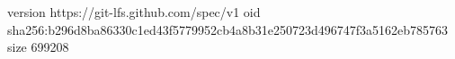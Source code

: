 version https://git-lfs.github.com/spec/v1
oid sha256:b296d8ba86330c1ed43f5779952cb4a8b31e250723d496747f3a5162eb785763
size 699208
